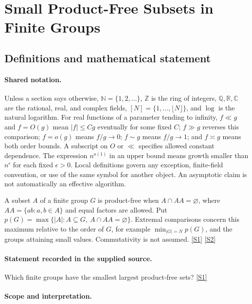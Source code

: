 \documentclass[11pt,a4paper]{article}
\newcommand{\N}{\mathbb{N}}
\newcommand{\Z}{\mathbb{Z}}
\newcommand{\Q}{\mathbb{Q}}
\newcommand{\R}{\mathbb{R}}
\newcommand{\C}{\mathbb{C}}
\newcommand{\sref}[2]{\hyperlink{source:#1:#2}{[S#2]}}
\begin{document}
\section{Small Product-Free Subsets in Finite Groups}\label{statement}


\subsection{Definitions and mathematical statement}

\paragraph{Shared notation.}Unless a section says otherwise, $\N=\{1,2,\ldots\}$,
$\Z$ is the ring of integers, $\Q,\R,\C$ are the rational, real, and complex
fields, $[N]=\{1,\ldots,\lfloor N\rfloor\}$, and $\log$ is the natural
logarithm. For real functions of a parameter tending to infinity,
$f\ll g$ and $f=O(g)$ mean $|f|\leq Cg$ eventually for some fixed $C$;
$f\gg g$ reverses this comparison; $f=o(g)$ means $f/g\to0$;
$f\sim g$ means $f/g\to1$; and $f\asymp g$ means both order bounds.
A subscript on $O$ or $\ll$ specifies allowed constant dependence.
The expression $n^{o(1)}$ in an upper bound means growth smaller than
$n^\epsilon$ for each fixed $\epsilon>0$. Local definitions govern any
exception, finite-field convention, or use of the same symbol for another
object. An asymptotic claim is not automatically an effective algorithm.



A subset $A$ of a finite group $G$ is product-free when $A\cap AA=\varnothing$, where $AA=\{ab:a,b\in A\}$ and equal factors are allowed. Put $p(G)=\max\{|A|:A\subseteq G,\ A\cap AA=\varnothing\}$. Extremal comparisons concern this maximum relative to the order of $G$, for example $\min_{|G|=N}p(G)$, and the groups attaining small values. Commutativity is not assumed. \sref{statement}{1} \sref{statement}{2}

\paragraph{Statement recorded in the supplied source.}
Which finite groups have the smallest largest product-free sets? \sref{statement}{1}

\paragraph{Scope and interpretation.}
\end{document}
